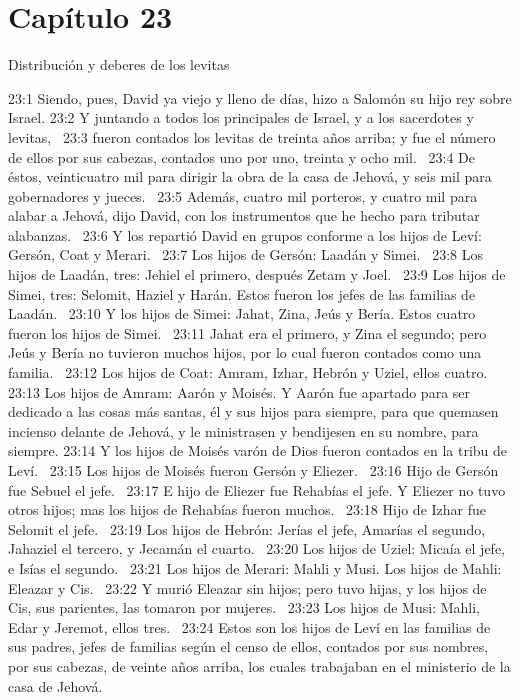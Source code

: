 \section*{Capítulo 23}
Distribución y deberes de los levitas  

23:1 Siendo, pues, David ya viejo y lleno de días, hizo a Salomón su hijo rey sobre Israel. 
23:2 Y juntando a todos los principales de Israel, y a los sacerdotes y levitas,  
23:3 fueron contados los levitas de treinta años arriba; y fue el número de ellos por sus cabezas, contados uno por uno, treinta y ocho mil.  
23:4 De éstos, veinticuatro mil para dirigir la obra de la casa de Jehová, y seis mil para gobernadores y jueces.  
23:5 Además, cuatro mil porteros, y cuatro mil para alabar a Jehová, dijo David, con los instrumentos que he hecho para tributar alabanzas.  
23:6 Y los repartió David en grupos conforme a los hijos de Leví: Gersón, Coat y Merari.  
23:7 Los hijos de Gersón: Laadán y Simei.  
23:8 Los hijos de Laadán, tres: Jehiel el primero, después Zetam y Joel.  
23:9 Los hijos de Simei, tres: Selomit, Haziel y Harán. Estos fueron los jefes de las familias de Laadán.  
23:10 Y los hijos de Simei: Jahat, Zina, Jeús y Bería. Estos cuatro fueron los hijos de Simei.  
23:11 Jahat era el primero, y Zina el segundo; pero Jeús y Bería no tuvieron muchos hijos, por lo cual fueron contados como una familia.  
23:12 Los hijos de Coat: Amram, Izhar, Hebrón y Uziel, ellos cuatro.  
23:13 Los hijos de Amram: Aarón y Moisés. Y Aarón fue apartado para ser dedicado a las cosas más santas, él y sus hijos para siempre, para que quemasen incienso delante de Jehová, y le ministrasen y bendijesen en su nombre, para siempre. 
23:14 Y los hijos de Moisés varón de Dios fueron contados en la tribu de Leví.  
23:15 Los hijos de Moisés fueron Gersón y Eliezer.  
23:16 Hijo de Gersón fue Sebuel el jefe.  
23:17 E hijo de Eliezer fue Rehabías el jefe. Y Eliezer no tuvo otros hijos; mas los hijos de Rehabías fueron muchos.  
23:18 Hijo de Izhar fue Selomit el jefe.  
23:19 Los hijos de Hebrón: Jerías el jefe, Amarías el segundo, Jahaziel el tercero, y Jecamán el cuarto.  
23:20 Los hijos de Uziel: Micaía el jefe, e Isías el segundo.  
23:21 Los hijos de Merari: Mahli y Musi. Los hijos de Mahli: Eleazar y Cis.  
23:22 Y murió Eleazar sin hijos; pero tuvo hijas, y los hijos de Cis, sus parientes, las tomaron por mujeres.  
23:23 Los hijos de Musi: Mahli, Edar y Jeremot, ellos tres.  
23:24 Estos son los hijos de Leví en las familias de sus padres, jefes de familias según el censo de ellos, contados por sus nombres, por sus cabezas, de veinte años arriba, los cuales trabajaban en el ministerio de la casa de Jehová.  
